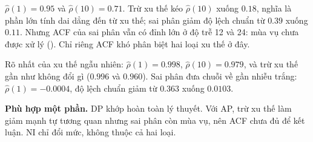  $\hat\rho(1)=0.95$ và $\hat\rho(10)=0.71$. Trừ xu thế kéo $\hat\rho(10)$ xuống $0.18$, nghĩa là phần lớn tính dai dẳng đến từ xu thế; sai phân giảm độ lệch chuẩn từ $0.39$ xuống $0.11$. Nhưng ACF của sai phân vẫn có đỉnh lớn ở độ trễ 12 và 24: mùa vụ chưa được xử lý (). Chỉ riêng ACF khó phân biệt hai loại xu thế ở đây.

 Rõ nhất của xu thế ngẫu nhiên: $\hat\rho(1)=0.998$, $\hat\rho(10)=0.979$, và trừ xu thế gần như không đổi gì ($0.996$ và $0.960$). Sai phân đưa chuỗi về gần nhiễu trắng: $\hat\rho(1)=-0.0004$, độ lệch chuẩn giảm từ $0.363$ xuống $0.0103$.

 \textbf{Phù hợp một phần.} DP khớp hoàn toàn lý thuyết. Với AP, trừ xu thế làm giảm mạnh tự tương quan nhưng sai phân còn mùa vụ, nên ACF chưa đủ để kết luận. NI chỉ đổi mức, không thuộc cả hai loại.

